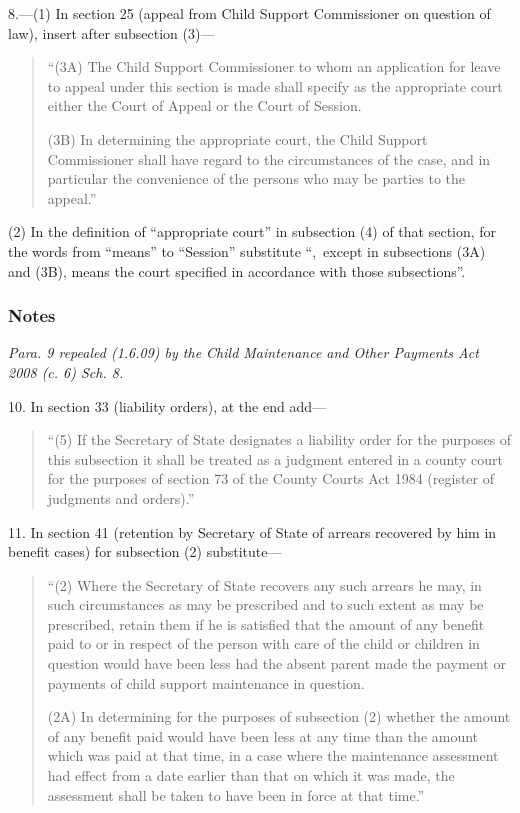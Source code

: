 \documentclass[a4paper]{article}
\newcommand\amendment[1]{\subsubsection*{Notes}{\itshape\frenchspacing\footnotesize #1 \par}}
\begin{document}
8.---(1) In section 25 (appeal from Child Support Commissioner on question of law), insert after subsection (3)—
\begin{quotation}
“(3A) The Child Support Commissioner to whom an application for leave to appeal under this section is made shall specify as the appropriate court either the Court of Appeal or the Court of Session.

(3B) In determining the appropriate court, the Child Support Commissioner shall have regard to the circumstances of the case, and in particular the convenience of the persons who may be parties to the appeal.”
\end{quotation}

(2) In the definition of “appropriate court” in subsection (4) of that section, for the words from “means” to “Session” substitute “,~except in subsections (3A) and (3B), means the court specified in accordance with those subsections”.

\amendment{
Para. 9 repealed (1.6.09) by the Child Maintenance and Other Payments Act 2008 (c. 6) Sch. 8.
}

\medskip

10. In section 33 (liability orders), at the end add—
\begin{quotation}
“(5) If the Secretary of State designates a liability order for the purposes of this subsection it shall be treated as a judgment entered in a county court for the purposes of section 73 of the County Courts Act 1984 (register of judgments and orders).”
\end{quotation}

\medskip

11. In section 41 (retention by Secretary of State of arrears recovered by him in benefit cases) for subsection (2) substitute—
\begin{quotation}
“(2) Where the Secretary of State recovers any such arrears he may, in such circumstances as may be prescribed and to such extent as may be prescribed, retain them if he is satisfied that the amount of any benefit paid to or in respect of the person with care of the child or children in question would have been less had the absent parent made the payment or payments of child support maintenance in question.

(2A) In determining for the purposes of subsection (2) whether the amount of any benefit paid would have been less at any time than the amount which was paid at that time, in a case where the maintenance assessment had effect from a date earlier than that on which it was made, the assessment shall be taken to have been in force at that time.”
\end{quotation}
\end{document}
